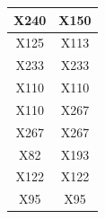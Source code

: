 \documentclass{beamer}
\newcommand{\boz}{\cellcolor{pathwaynode}}
\begin{document}
\begin{frame}[plain]
\begin{textblock*}{\paperwidth}
\begin{tabular}{| c c |}
\boz X240   &  \boz X150  \\ \hline
\boz X125   &  \boz X113  \\ \hline
X233   &  X233  \\ \hline
X110   &  X110  \\ \hline
X110   &  X267  \\ \hline
X267   &  X267  \\ \hline
\boz X82   &  \boz X193  \\ \hline
X122   &  X122  \\ \hline
X95   &  X95  \\ \hline
    \end{tabular}
    \hspace{.5em}
  \end{textblock*}
\end{frame}
\end{document}
